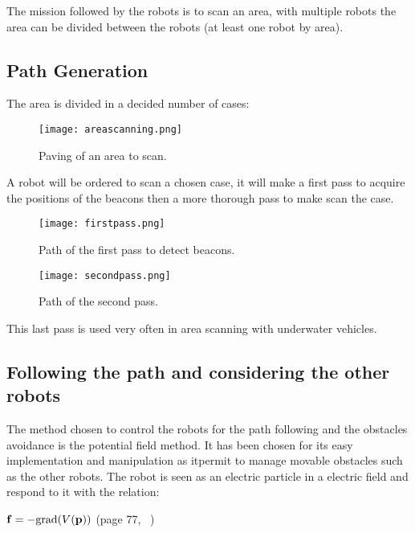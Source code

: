 The mission followed by the robots is to scan an area, with multiple robots the area can be divided between the robots (at least one robot by area).

\subsection{Path Generation}\label{ssec:pathgen}

The area is divided in a decided number of cases:

\begin{figure}[H]
\centering
\texttt{[image: areascanning.png]}
\caption{Paving of an area to scan.}
\label{fig:areaScan}
\end{figure}

A robot will be ordered to scan a chosen case, it will make a first pass to acquire the positions of the beacons then a more thorough pass to make scan the case.

\begin{figure}[H]
\centering
    \begin{minipage}[b]{0.4\textwidth}
    \texttt{[image: firstpass.png]}
    \caption{Path of the first pass to detect beacons.}
    \label{fig:firstpass}
    \end{minipage}
    \begin{minipage}[b]{0.4\textwidth}
    \texttt{[image: secondpass.png]}
    \caption{Path of the second pass.}
    \label{fig:secondpass}
    \end{minipage}
\end{figure}

This last pass is used very often in area scanning with underwater vehicles.


\subsection{Following the path and considering the other robots}

The method chosen to control the robots for the path following and the obstacles avoidance is the potential field method. It has been chosen for its easy implementation and manipulation as itpermit to manage movable obstacles such as the other robots.
The robot is seen as an electric particle in a electric field and respond to it with the relation:

$\mathbf{f} = -\textnormal{grad}(V(\mathbf{p}))$ (page 77, ~\cite{jaulin2015mobile})\\

